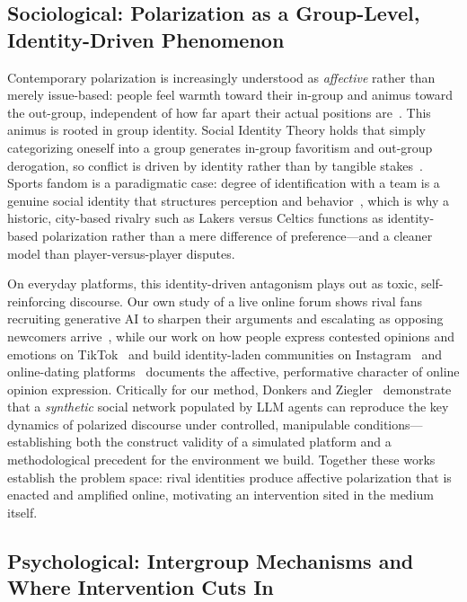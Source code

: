 \subsection{Sociological: Polarization as a Group-Level, Identity-Driven Phenomenon}
\label{sec:rw-socio}

Contemporary polarization is increasingly understood as \emph{affective} rather
than merely issue-based: people feel warmth toward their in-group and animus
toward the out-group, independent of how far apart their actual positions
are~\cite{iyengar2015fear,iyengar2019origins}. This animus is rooted in group
identity. Social Identity Theory holds that simply categorizing oneself into a
group generates in-group favoritism and out-group derogation, so conflict is
driven by identity rather than by tangible stakes~\cite{tajfel1979sit}. Sports
fandom is a paradigmatic case: degree of identification with a team is a genuine
social identity that structures perception and behavior~\cite{wann1993identification},
which is why a historic, city-based rivalry such as Lakers versus Celtics
functions as identity-based polarization rather than a mere difference of
preference---and a cleaner model than player-versus-player disputes.

On everyday platforms, this identity-driven antagonism plays out as toxic,
self-reinforcing discourse. Our own study of a live online forum shows rival fans
recruiting generative AI to sharpen their arguments and escalating as opposing
newcomers arrive~\cite{zeng2025ronaldo}, while our work on how people express
contested opinions and emotions on TikTok~\cite{zhang2026climate} and build
identity-laden communities on Instagram~\cite{zhang2026adhd} and online-dating
platforms~\cite{zhang2025dating} documents the affective, performative character
of online opinion expression. Critically for our method, Donkers and
Ziegler~\cite{donkers2025synthetic} demonstrate that a \emph{synthetic} social
network populated by LLM agents can reproduce the key dynamics of polarized
discourse under controlled, manipulable conditions---establishing both the
construct validity of a simulated platform and a methodological precedent for the
environment we build. Together these works establish the problem space: rival
identities produce affective polarization that is enacted and amplified online,
motivating an intervention sited in the medium itself.

\subsection{Psychological: Intergroup Mechanisms and Where Intervention Cuts In}
\label{sec:rw-psych}

